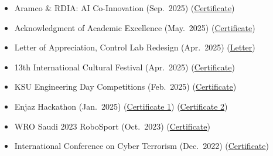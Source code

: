\documentclass[a4paper,11pt]{article}
\begin{document}
\begin{itemize}
    \item Aramco \& RDIA: AI Co-Innovation (Sep.\ 2025) (\href{https://drive.google.com/file/d/1nK80cLlYmrL7zdheAk0iBbEg5E7hZLQ1}{Certificate})
    \item Acknowledgment of Academic Excellence (May.\ 2025) (\href{https://drive.google.com/file/d/1uWwoPLUG6_SnSjrmVi59E9qlraesoGZN}{Certificate})
    \item Letter of Appreciation, Control Lab Redesign (Apr.\ 2025) (\href{https://drive.google.com/file/d/1U9wT50v8ILNLe8uOIA3PEqst3398xWAI}{Letter})
    \item 13th International Cultural Festival (Apr.\ 2025) (\href{https://drive.google.com/file/d/11go0R0-DrOSXo_JHKjosuXk-_3gTVG38}{Certificate})
    \item KSU Engineering Day Competitions (Feb.\ 2025) (\href{https://drive.google.com/file/d/1yqjpORplfalYprRufce9tcu6ARD4IiX7}{Certificate})
    \item Enjaz Hackathon (Jan.\ 2025) (\href{https://drive.google.com/file/d/1Sf54DT8y95k4F92S2wiBXaH75mxIL_mk}{Certificate 1}) (\href{https://drive.google.com/file/d/1aL0fQ2zMIULmd_scjSJOl4Cgo_PJy3ho}{Certificate 2})
    \item WRO Saudi 2023 RoboSport (Oct.\ 2023) (\href{https://drive.google.com/file/d/1zBxdX8rtewzGz0tqwLYWdWaltRhbXjqd}{Certificate})
    \item International Conference on Cyber Terrorism (Dec.\ 2022) (\href{https://drive.google.com/file/d/1DEWFjuyaYwk1IP00cqpmQC7vgaG10q9M}{Certificate})
\end{itemize}
\end{document}
